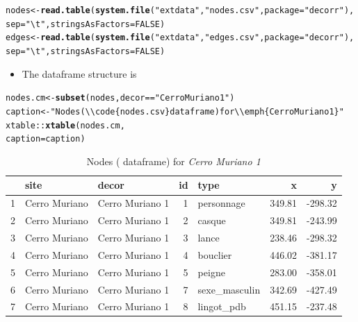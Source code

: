 \documentclass[article]{jss}\usepackage[]{graphicx}\usepackage[]{color}
\makeatletter
\newcommand{\hlnum}[1]{\textcolor[rgb]{0.686,0.059,0.569}{#1}}%
\newcommand{\hlstr}[1]{\textcolor[rgb]{0.192,0.494,0.8}{#1}}%
\newcommand{\hlopt}[1]{\textcolor[rgb]{0,0,0}{#1}}%
\newcommand{\hlstd}[1]{\textcolor[rgb]{0.345,0.345,0.345}{#1}}%
\newcommand{\hlkwb}[1]{\textcolor[rgb]{0.69,0.353,0.396}{#1}}%
\newcommand{\hlkwc}[1]{\textcolor[rgb]{0.333,0.667,0.333}{#1}}%
\newcommand{\hlkwd}[1]{\textcolor[rgb]{0.737,0.353,0.396}{\textbf{#1}}}%
\newenvironment{kframe}{%
 \def\at@end@of@kframe{}%
 \ifinner\ifhmode%
  \def\at@end@of@kframe{\end{minipage}}%
  \begin{minipage}{\columnwidth}%
 \fi\fi%
 \def\FrameCommand##1{\hskip\@totalleftmargin \hskip-\fboxsep
 \colorbox{shadecolor}{##1}\hskip-\fboxsep
     \hskip-\linewidth \hskip-\@totalleftmargin \hskip\columnwidth}%
 \MakeFramed {\advance\hsize-\width
   \@totalleftmargin\z@ \linewidth\hsize
   \@setminipage}}%
 {\par\unskip\endMakeFramed%
 \at@end@of@kframe}
\newenvironment{knitrout}{}{} %
\makeatother
\begin{document}
\begin{knitrout}
\color{fgcolor}\begin{kframe}
\begin{alltt}
\hlstd{nodes} \hlkwb{<-} \hlkwd{read.table}\hlstd{(}\hlkwd{system.file}\hlstd{(}\hlstr{"extdata"}\hlstd{,} \hlstr{"nodes.csv"}\hlstd{,} \hlkwc{package} \hlstd{=} \hlstr{"decorr"}\hlstd{),}
                    \hlkwc{sep}\hlstd{=}\hlstr{"\textbackslash{}t"}\hlstd{,}\hlkwc{stringsAsFactors} \hlstd{=} \hlnum{FALSE}\hlstd{)}
\hlstd{edges} \hlkwb{<-} \hlkwd{read.table}\hlstd{(}\hlkwd{system.file}\hlstd{(}\hlstr{"extdata"}\hlstd{,} \hlstr{"edges.csv"}\hlstd{,} \hlkwc{package} \hlstd{=} \hlstr{"decorr"}\hlstd{),}
                    \hlkwc{sep}\hlstd{=}\hlstr{"\textbackslash{}t"}\hlstd{,}\hlkwc{stringsAsFactors} \hlstd{=} \hlnum{FALSE}\hlstd{)}
\end{alltt}
\end{kframe}
\end{knitrout}

\begin{itemize}
\item The  dataframe structure is
\end{itemize}

\begin{kframe}
\begin{alltt}
\hlstd{nodes.cm} \hlkwb{<-} \hlkwd{subset}\hlstd{(nodes, decor} \hlopt{==} \hlstr{"Cerro Muriano 1"}\hlstd{)}
\hlstd{caption} \hlkwb{<-} \hlstr{"Nodes (\textbackslash{}\textbackslash{}code\{nodes.csv\} dataframe) for \textbackslash{}\textbackslash{}emph\{Cerro Muriano 1\}"}
\hlstd{xtable}\hlopt{::}\hlkwd{xtable}\hlstd{(nodes.cm,}
       \hlkwc{caption} \hlstd{= caption)}
\end{alltt}
\end{kframe}%
\begin{table}[ht]
\centering
\begin{tabular}{rllrlrr}
  \hline
 & site & decor & id & type & x & y \\ 
  \hline
1 & Cerro Muriano & Cerro Muriano 1 &   1 & personnage & 349.81 & -298.32 \\ 
  2 & Cerro Muriano & Cerro Muriano 1 &   2 & casque & 349.81 & -243.99 \\ 
  3 & Cerro Muriano & Cerro Muriano 1 &   3 & lance & 238.46 & -298.32 \\ 
  4 & Cerro Muriano & Cerro Muriano 1 &   4 & bouclier & 446.02 & -381.17 \\ 
  5 & Cerro Muriano & Cerro Muriano 1 &   5 & peigne & 283.00 & -358.01 \\ 
  6 & Cerro Muriano & Cerro Muriano 1 &   7 & sexe\_masculin & 342.69 & -427.49 \\ 
  7 & Cerro Muriano & Cerro Muriano 1 &   8 & lingot\_pdb & 451.15 & -237.48 \\ 
   \hline
\end{tabular}
\caption{Nodes ( dataframe) for \emph{Cerro Muriano 1}} 
\end{table}
\end{document}
